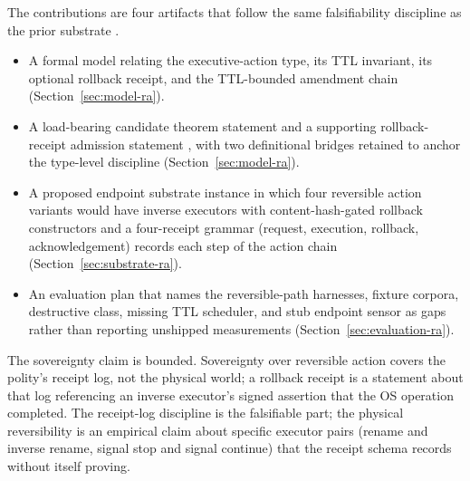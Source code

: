 The contributions are four artifacts that follow the same falsifiability
discipline as the prior substrate
\cite{programmableSovereigntyAnonymous}.

\begin{itemize}
  \item A formal model relating the executive-action type, its TTL
    invariant, its optional rollback receipt, and the TTL-bounded
    amendment chain (Section~\ref{sec:model-ra}).
  \item A load-bearing candidate theorem statement
     and a
    supporting rollback-receipt admission statement
    , with two
    definitional bridges retained to anchor the type-level discipline
    (Section~\ref{sec:model-ra}).
  \item A proposed endpoint substrate instance in which four reversible
    action variants would have inverse executors with content-hash-gated
    rollback constructors and a four-receipt grammar (request, execution,
    rollback, acknowledgement) records each step of the action chain
    (Section~\ref{sec:substrate-ra}).
  \item An evaluation plan that names the reversible-path harnesses,
    fixture corpora, destructive class, missing TTL scheduler, and stub
    endpoint sensor as gaps rather than reporting unshipped measurements
    (Section~\ref{sec:evaluation-ra}).
\end{itemize}

The sovereignty claim is bounded. Sovereignty over reversible action
covers the polity's receipt log, not the physical world; a rollback
receipt is a statement about that log referencing an inverse executor's
signed assertion that the OS operation completed. The receipt-log
discipline is the falsifiable part; the physical reversibility is an
empirical claim about specific executor pairs (rename and inverse
rename, signal stop and signal continue) that the receipt schema
records without itself proving.
